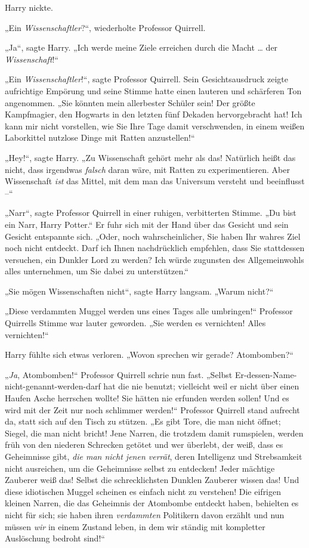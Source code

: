 {Harry nickte.

„Ein \emph{Wissenschaftler}?“, wiederholte Professor Quirrell.

„Ja“, sagte Harry. „Ich werde meine Ziele erreichen durch die Macht … der \emph{Wissenschaft}!“

„Ein \emph{Wissenschaftler}!“, sagte Professor Quirrell. Sein Gesichtsausdruck zeigte aufrichtige Empörung und seine Stimme hatte einen lauteren und schärferen Ton angenommen. „Sie könnten mein allerbester Schüler sein! Der größte Kampfmagier, den Hogwarts in den letzten fünf Dekaden hervorgebracht hat! Ich kann mir nicht vorstellen, wie Sie Ihre Tage damit verschwenden, in einem weißen Laborkittel nutzlose Dinge mit Ratten anzustellen!“

„Hey!“, sagte Harry. „Zu Wissenschaft gehört mehr als das! Natürlich heißt das nicht, dass irgendwas \emph{falsch} daran wäre, mit Ratten zu experimentieren. Aber Wissenschaft \emph{ist} das Mittel, mit dem man das Universum versteht und beeinflusst --“

„Narr“, sagte Professor Quirrell in einer ruhigen, verbitterten Stimme. „Du bist ein Narr, Harry Potter.“ Er fuhr sich mit der Hand über das Gesicht und sein Gesicht entspannte sich. „Oder, noch wahrscheinlicher, Sie haben Ihr wahres Ziel noch nicht entdeckt. Darf ich Ihnen nachdrücklich empfehlen, dass Sie stattdessen versuchen, ein Dunkler Lord zu werden? Ich würde zugunsten des Allgemeinwohls alles unternehmen, um Sie dabei zu unterstützen.“

„Sie mögen Wissenschaften nicht“, sagte Harry langsam. „Warum nicht?“

„Diese verdammten Muggel werden uns eines Tages alle umbringen!“ Professor Quirrells Stimme war lauter geworden. „Sie werden es vernichten! Alles vernichten!“

Harry fühlte sich etwas verloren. „Wovon sprechen wir gerade? Atombomben?“

„\emph{Ja}, Atombomben!“ Professor Quirrell schrie nun fast. „Selbst Er-dessen-Name-nicht-genannt-werden-darf hat die nie benutzt; vielleicht weil er nicht über einen Haufen Asche herrschen wollte! Sie hätten nie erfunden werden sollen! Und es wird mit der Zeit nur noch schlimmer werden!“ Professor Quirrell stand aufrecht da, statt sich auf den Tisch zu stützen. „Es gibt Tore, die man nicht öffnet; Siegel, die man nicht bricht! Jene Narren, die trotzdem damit rumspielen, werden früh von den niederen Schrecken getötet und wer überlebt, der weiß, dass es Geheimnisse gibt, \emph{die man nicht jenen verrät}, deren Intelligenz und Strebsamkeit nicht ausreichen, um die Geheimnisse selbst zu entdecken! Jeder mächtige Zauberer weiß das! Selbst die schrecklichsten Dunklen Zauberer wissen das! Und diese idiotischen Muggel scheinen es einfach nicht zu verstehen! Die eifrigen kleinen Narren, die das Geheimnis der Atombombe entdeckt haben, behielten es nicht für sich; sie haben ihren \emph{verdammten} Politikern davon erzählt und nun müssen \emph{wir} in einem Zustand leben, in dem wir ständig mit kompletter Auslöschung bedroht sind!“

}
